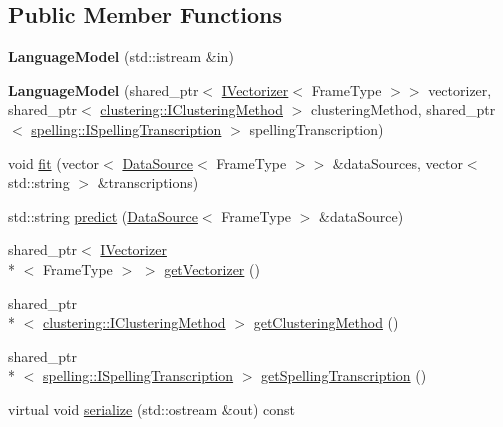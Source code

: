 \subsection*{Public Member Functions}
\begin{DoxyCompactItemize}
\item 
\hypertarget{classspeech_1_1LanguageModel_a653f37a791e75e9ea968d58b6ee7d2fa}{{\bfseries Language\+Model} (std\+::istream \&in)}\label{classspeech_1_1LanguageModel_a653f37a791e75e9ea968d58b6ee7d2fa}

\item 
\hypertarget{classspeech_1_1LanguageModel_a810070486190924d9f9ba1afb3fe61c2}{{\bfseries Language\+Model} (shared\+\_\+ptr$<$ \hyperlink{classspeech_1_1vectorizer_1_1IVectorizer}{I\+Vectorizer}$<$ Frame\+Type $>$$>$ vectorizer, shared\+\_\+ptr$<$ \hyperlink{classspeech_1_1clustering_1_1IClusteringMethod}{clustering\+::\+I\+Clustering\+Method} $>$ clustering\+Method, shared\+\_\+ptr$<$ \hyperlink{classspeech_1_1spelling_1_1ISpellingTranscription}{spelling\+::\+I\+Spelling\+Transcription} $>$ spelling\+Transcription)}\label{classspeech_1_1LanguageModel_a810070486190924d9f9ba1afb3fe61c2}

\item 
void \hyperlink{classspeech_1_1LanguageModel_a07bc11f505b763e363748e7e1533615c}{fit} (vector$<$ \hyperlink{classspeech_1_1raw__data_1_1DataSource}{Data\+Source}$<$ Frame\+Type $>$$>$ \&data\+Sources, vector$<$ std\+::string $>$ \&transcriptions)
\item 
std\+::string \hyperlink{classspeech_1_1LanguageModel_ada9a59cc5f394d8ddecb650c0f334d87}{predict} (\hyperlink{classspeech_1_1raw__data_1_1DataSource}{Data\+Source}$<$ Frame\+Type $>$ \&data\+Source)
\item 
shared\+\_\+ptr$<$ \hyperlink{classspeech_1_1vectorizer_1_1IVectorizer}{I\+Vectorizer}\\*
$<$ Frame\+Type $>$ $>$ \hyperlink{classspeech_1_1LanguageModel_adbcee84dfcd012a9c9a12fc5dde7f3f6}{get\+Vectorizer} ()
\item 
shared\+\_\+ptr\\*
$<$ \hyperlink{classspeech_1_1clustering_1_1IClusteringMethod}{clustering\+::\+I\+Clustering\+Method} $>$ \hyperlink{classspeech_1_1LanguageModel_afb61fb7cf00950c3c85ed2860c17d83c}{get\+Clustering\+Method} ()
\item 
shared\+\_\+ptr\\*
$<$ \hyperlink{classspeech_1_1spelling_1_1ISpellingTranscription}{spelling\+::\+I\+Spelling\+Transcription} $>$ \hyperlink{classspeech_1_1LanguageModel_a0c5dab5aad9bb4dabc92bedbce99cfb6}{get\+Spelling\+Transcription} ()
\item 
virtual void \hyperlink{classspeech_1_1LanguageModel_ae3c30d0a1a1a5e60fd69954b432766fa}{serialize} (std\+::ostream \&out) const 
\end{DoxyCompactItemize}
